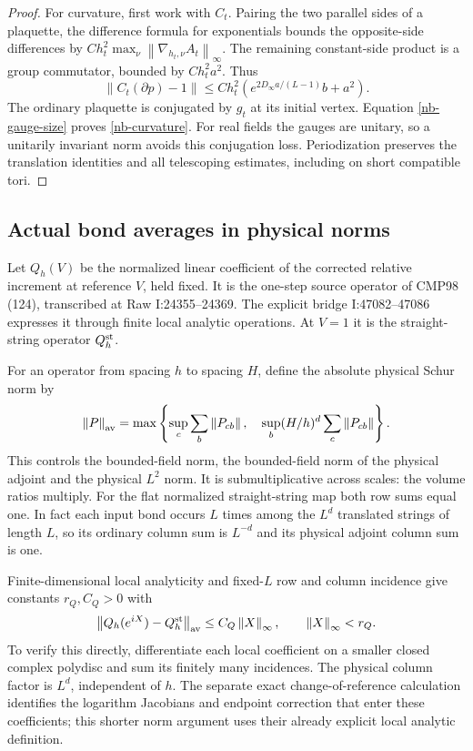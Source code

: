 \documentclass[11pt]{article}
\theoremstyle{remark}
\newcommand{\norm}[1]{\left\|#1\right\|}
\begin{document}
\begin{proof}
For curvature, first work with $C_t$. Pairing the two parallel
sides of a plaquette, the difference formula for exponentials
bounds the opposite-side differences by
$Ch_t^2\max_\nu\norm{\nabla_{h_t,\nu}A_t}_\infty$.
The remaining constant-side product is a group commutator,
bounded by $Ch_t^2a^2$. Thus
\[
 \norm{C_t(\partial p)-1}
 \le Ch_t^2\left(e^{2D_\infty a/(L-1)}b+a^2\right).
\]
The ordinary plaquette is conjugated by $g_t$ at its initial
vertex. Equation \eqref{nb-gauge-size} proves
\eqref{nb-curvature}. For real fields the gauges are unitary,
so a unitarily invariant norm avoids this conjugation loss.
Periodization preserves the translation identities and all
telescoping estimates, including on short compatible tori.
\end{proof}

\subsection{Actual bond averages in physical norms}

Let $Q_h(V)$ be the normalized linear coefficient of the
corrected relative increment at reference $V$, held fixed.
It is the one-step source operator of CMP98 (124), transcribed
at Raw I:24355--24369. The explicit bridge I:47082--47086
expresses it through finite local analytic operations. At $V=1$
it is the straight-string operator $Q_h^{\rm st}$.

For an operator from spacing $h$ to spacing $H$, define the
absolute physical Schur norm by
\begin{equation}\label{nb-av-norm}
 \norm{P}_{\rm av}
 =\max\left\{
       \sup_c\sum_b\norm{P_{cb}},\quad
       \sup_b(H/h)^d\sum_c\norm{P_{cb}}\right\}.
\end{equation}
This controls the bounded-field norm, the bounded-field norm
of the physical adjoint and the physical $L^2$ norm. It is
submultiplicative across scales: the volume ratios multiply.
For the flat normalized straight-string map both row sums
equal one. In fact each input bond occurs $L$ times among
the $L^d$ translated strings of length $L$, so its ordinary
column sum is $L^{-d}$ and its physical adjoint column sum
is one.

Finite-dimensional local analyticity and fixed-$L$ row and
column incidence give constants $r_Q,C_Q>0$ with
\begin{equation}\label{nb-local-Q-difference}
 \norm{Q_h(e^{iX})-Q_h^{\rm st}}_{\rm av}
             \le C_Q\norm{X}_\infty,
                 \qquad\norm{X}_\infty<r_Q.
\end{equation}
To verify this directly, differentiate each local coefficient
on a smaller closed complex polydisc and sum its finitely many
incidences. The physical column factor is $L^d$, independent
of $h$. The separate exact change-of-reference calculation
identifies the logarithm Jacobians and endpoint correction
that enter these coefficients; this shorter norm argument
uses their already explicit local analytic definition.
\end{document}
